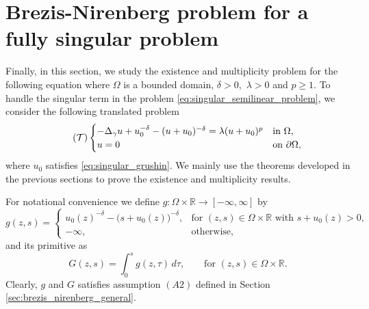 \documentclass[11pt]{article}
\newcommand{\om} {\Omega}
\newcommand{\la} {\lambda}
\newcommand{\real}{\mathbb{R}}
\newcommand{\Gr}{\Delta_{\gamma}}
\begin{document}
\section{Brezis-Nirenberg problem for a fully singular problem}\label{sec:brezis_nirenberg_grushin}
Finally, in this section, we study the existence and multiplicity problem for the following equation
where $\om$ is a bounded domain, $\delta>0,$ $\la > 0$ and $p \geq 1$.
To handle the singular term in the problem \eqref{eq:singular_semilinear_problem}, we consider the following translated problem 
\begin{equation}\tag{$\mathcal{T}$}
\label{eq:shifted_singular_problem}
\begin{cases}
-\Gr u + u_{0}^{-\delta} - (u + u_{0})^{-\delta} = \lambda (u + u_{0})^{p} & \text{in } \Omega, \\
u = 0 & \text{on } \partial\Omega,
\end{cases}
\end{equation}
where $u_{0}$ satisfies \eqref{eq:singular_grushin}. 
We mainly use the theorems developed in the previous sections to prove the existence and multiplicity results. 



For notational convenience we define $g: \om \times \real \to [-\infty, \infty]$ by 
\begin{equation*}
g(z,s) =
\begin{cases}
u_{0}(z)^{-\delta} - \bigl( s + u_{0}(z) \bigr)^{-\delta},
& \text{for } (z,s) \in \Omega \times \mathbb{R} \text{ with } s + u_{0}(z) > 0, \\[0.6ex]
-\infty, & \text{otherwise},
\end{cases}
\end{equation*}
and its primitive as
\begin{equation*}
G(z,s) = \displaystyle \int_{0}^{s} g(z,\tau)\, d\tau,
\qquad \text{for } (z,s) \in \Omega \times \mathbb{R}.
\end{equation*}
Clearly, $g$ and $G$ satisfies assumption $(A2)$ defined in Section \ref{sec:brezis_nirenberg_general}.
\end{document}
